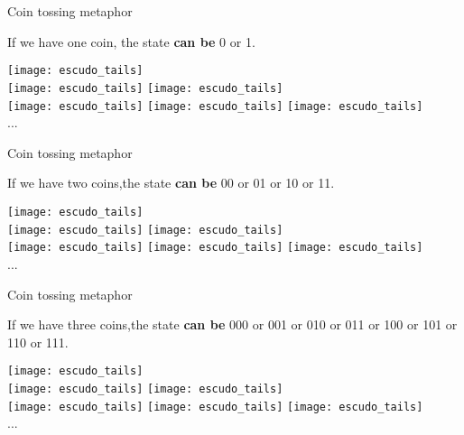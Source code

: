 \documentclass[aspectratio=43]{beamer}
\begin{document}
\begin{frame}{Coin tossing metaphor}
	\begin{cardTiny}
		If we have one coin, the state \textbf{can be} 0 or 1.
	\end{cardTiny}
    \begin{center}
        \texttt{[image: escudo\_tails]}\\
        \texttt{[image: escudo\_tails]}
        \texttt{[image: escudo\_tails]}\\
        \texttt{[image: escudo\_tails]}
        \texttt{[image: escudo\_tails]}
        \texttt{[image: escudo\_tails]}\\...
	\end{center}
\pagenumber
\end{frame}

\begin{frame}{Coin tossing metaphor}
	\begin{cardTiny}
		If we have two coins,the state \textbf{can be} 00 or 01 or 10 or 11.
	\end{cardTiny}
    \begin{center}
        \texttt{[image: escudo\_tails]}\\
        \texttt{[image: escudo\_tails]}
        \texttt{[image: escudo\_tails]}\\
        \texttt{[image: escudo\_tails]}
        \texttt{[image: escudo\_tails]}
        \texttt{[image: escudo\_tails]}\\...
	\end{center}
\pagenumber
\end{frame}

\begin{frame}{Coin tossing metaphor}
	\begin{cardTiny}
		If we have three coins,the state \textbf{can be} 000 or 001 or 010 or 011 or 100 or 101 or 110 or 111.
	\end{cardTiny}
    \begin{center}
        \texttt{[image: escudo\_tails]}\\
        \texttt{[image: escudo\_tails]}
        \texttt{[image: escudo\_tails]}\\
        \texttt{[image: escudo\_tails]}
        \texttt{[image: escudo\_tails]}
        \texttt{[image: escudo\_tails]}\\...
	\end{center}
\pagenumber
\end{frame}
\end{document}
